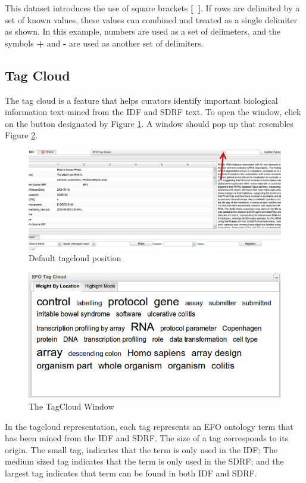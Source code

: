 \documentclass[a4paper]{article}
\begin{document}
This dataset introduces the use of square brackets \textbf{[~]}. If rows are delimited by a set of known values, these values can combined and treated as a single delimiter as shown. In this example, numbers are used as a set of delimeters, and the symbols \textbf{+} and \textbf{-} are used as another set of delimiters.



\subsection{Tag Cloud}
The tag cloud is a feature that helps curators identify important biological information text-mined from the IDF and SDRF text. To open the window, click on the button designated by Figure \ref{tagcloudopen}. A window should pop up that resembles Figure \ref{tagcloud}. 

\begin{figure}[h]
\caption{Default tagcloud position}
\centering
\label{tagcloudopen}
\includegraphics[width=17cm]{images/tagcloudopen}
\end{figure}

\begin{figure}[h]
\caption{The TagCloud Window}
\centering
\label{tagcloud}
\includegraphics[width=12cm]{images/tagcloud}
\end{figure}

In the tagcloud representation, each tag represents an EFO ontology term that has been mined from the IDF and SDRF. The size of a tag corresponds to its origin. The small tag, indicates that the term is only used in the IDF; The medium sized tag indicates that the term is only used in the SDRF; and the largest tag indicates that term can be found in both IDF and SDRF.
\end{document}
